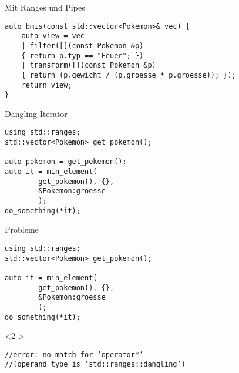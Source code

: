 \begin{frame}[fragile]{Mit Ranges und Pipes}
    \begin{verbatim}
auto bmis(const std::vector<Pokemon>& vec) {
    auto view = vec
    | filter([](const Pokemon &p)
    { return p.typ == "Feuer"; })
    | transform([](const Pokemon &p)
    { return (p.gewicht / (p.groesse * p.groesse)); });
    return view;
}
\end{verbatim}
\end{frame}

\begin{frame}[fragile]{Dangling Iterator}
    \begin{overlayarea}{\linewidth}{3cm}
        \begin{verbatim}
using std::ranges;
std::vector<Pokemon> get_pokemon();

auto pokemon = get_pokemon();
auto it = min_element(
        get_pokemon(), {},
        &Pokemon:groesse
        );
do_something(*it);
    \end{verbatim}
    \end{overlayarea}
\end{frame}

\begin{frame}[fragile]{Probleme}
    \begin{overlayarea}{\linewidth}{3cm}
        \begin{verbatim}
using std::ranges;
std::vector<Pokemon> get_pokemon();

auto it = min_element(
        get_pokemon(), {},
        &Pokemon:groesse
        );
do_something(*it);
    \end{verbatim}
        \begin{onlyenv}<2->
            \begin{verbatim}
//error: no match for ‘operator*’
//(operand type is ‘std::ranges::dangling’)
        \end{verbatim}
        \end{onlyenv}
    \end{overlayarea}
\end{frame}



